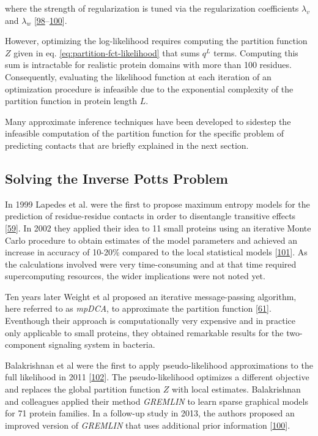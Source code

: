 \documentclass[11pt,a4paper,twoside]{book}
\theoremstyle{definition}
\theoremstyle{definition}
\theoremstyle{remark}
\begin{document}
where the strength of regularization is tuned via the regularization
coefficients \(\lambda_v\) and \(\lambda_w\)
{[}\protect\hyperlink{ref-Seemayer2014}{98}--\protect\hyperlink{ref-Kamisetty2013}{100}{]}.

However, optimizing the log-likelihood requires computing the partition
function \(Z\) given in eq. \eqref{eq:partition-fct-likelihood} that sums
\(q^L\) terms. Computing this sum is intractable for realistic protein
domains with more than 100 residues. Consequently, evaluating the
likelihood function at each iteration of an optimization procedure is
infeasible due to the exponential complexity of the partition function
in protein length \(L\).

Many approximate inference techniques have been developed to sidestep
the infeasible computation of the partition function for the specific
problem of predicting contacts that are briefly explained in the next
section.

\subsection{Solving the Inverse Potts
Problem}\label{potts-model-solutions}

In 1999 Lapedes et al. were the first to propose maximum entropy models
for the prediction of residue-residue contacts in order to disentangle
transitive effects {[}\protect\hyperlink{ref-Lapedes1999}{59}{]}. In
2002 they applied their idea to 11 small proteins using an iterative
Monte Carlo procedure to obtain estimates of the model parameters and
achieved an increase in accuracy of 10-20\% compared to the local
statistical models {[}\protect\hyperlink{ref-Lapedes2012a}{101}{]}. As
the calculations involved were very time-consuming and at that time
required supercomputing resources, the wider implications were not noted
yet.

Ten years later Weight et al proposed an iterative message-passing
algorithm, here referred to as \emph{mpDCA}, to approximate the
partition function {[}\protect\hyperlink{ref-Weigt2009}{61}{]}.
Eventhough their approach is computationally very expensive and in
practice only applicable to small proteins, they obtained remarkable
results for the two-component signaling system in bacteria.

Balakrishnan et al were the first to apply pseudo-likelihood
approximations to the full likelihood in 2011
{[}\protect\hyperlink{ref-Balakrishnan2011}{102}{]}. The
pseudo-likelihood optimizes a different objective and replaces the
global partition function \(Z\) with local estimates. Balakrishnan and
colleagues applied their method \emph{GREMLIN} to learn sparse graphical
models for 71 protein families. In a follow-up study in 2013, the
authors proposed an improved version of \emph{GREMLIN} that uses
additional prior information
{[}\protect\hyperlink{ref-Kamisetty2013}{100}{]}.
\end{document}
